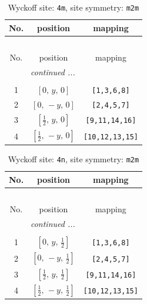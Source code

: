 \documentclass[fleqn,8pt]{jsarticle}
\begin{document}
\renewcommand{\arraystretch}{1.2}
\begin{longtable}{ccc}
\caption{Wyckoff site: {\tt 4m}, site symmetry: {\tt m2m}}
 \\
 \hline \hline
No. & position & mapping \\ \hline \endfirsthead

\multicolumn{2}{l}{\tablename\ \thetable{}} \\
 \hline \hline
No. & position & mapping \\ \hline \endhead

 \hline \hline
\multicolumn{2}{r}{\footnotesize\it continued ...} \\ \endfoot

 \hline \hline
\multicolumn{2}{r}{} \\ \endlastfoot

1 & $\left[ 0,\, y,\, 0 \right]$ & {\tt [1,3,6,8]} \\ \hline
2 & $\left[ 0,\, - y,\, 0 \right]$ & {\tt [2,4,5,7]} \\ \hline
3 & $\left[ \frac{1}{2},\, y,\, 0 \right]$ & {\tt [9,11,14,16]} \\ \hline
4 & $\left[ \frac{1}{2},\, - y,\, 0 \right]$ & {\tt [10,12,13,15]} \\
\end{longtable}
\renewcommand{\arraystretch}{1.2}
\begin{longtable}{ccc}
\caption{Wyckoff site: {\tt 4n}, site symmetry: {\tt m2m}}
 \\
 \hline \hline
No. & position & mapping \\ \hline \endfirsthead

\multicolumn{2}{l}{\tablename\ \thetable{}} \\
 \hline \hline
No. & position & mapping \\ \hline \endhead

 \hline \hline
\multicolumn{2}{r}{\footnotesize\it continued ...} \\ \endfoot

 \hline \hline
\multicolumn{2}{r}{} \\ \endlastfoot

1 & $\left[ 0,\, y,\, \frac{1}{2} \right]$ & {\tt [1,3,6,8]} \\ \hline
2 & $\left[ 0,\, - y,\, \frac{1}{2} \right]$ & {\tt [2,4,5,7]} \\ \hline
3 & $\left[ \frac{1}{2},\, y,\, \frac{1}{2} \right]$ & {\tt [9,11,14,16]} \\ \hline
4 & $\left[ \frac{1}{2},\, - y,\, \frac{1}{2} \right]$ & {\tt [10,12,13,15]} \\
\end{longtable}
\end{document}
